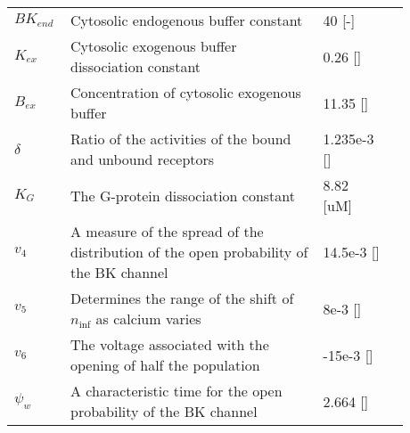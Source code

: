 \begin{table}[h!]
	\centering
	\begin{tabular}{| p{0.09\linewidth} | >{\footnotesize} p{0.6\linewidth} | >{\footnotesize} p{0.17\linewidth} | >{\footnotesize} p{0.02\linewidth} |}
		\arrayrulecolor{lightgrey}\hline
		
		$BK_{end}$      & Cytosolic endogenous buffer constant                              & 40 [-] & \cite{LoesEvert} \\
		$K_{ex}$        & Cytosolic exogenous buffer dissociation constant                  & 0.26 [\uM] & \cite{LoesEvert} \\
		$B_{ex}$        & Concentration of cytosolic exogenous buffer                       & 11.35 [\uM] & \cite{LoesEvert} \\
		$\delta$        & Ratio of the activities of the bound and unbound receptors        & 1.235e-3 [\uM] & \cite{LoesEvert}\\
		$K_G$           & The G-protein dissociation constant                               & 8.82  [uM] & \cite{LoesEvert}\\
		$v_{4}$			& A measure of the spread of the distribution of the open probability of the BK channel	& 14.5e-3 [\Volt]   &  \cite{Gonzalez1994}  
		\\
		$v_{5}$			& Determines the range of the shift of $n_\inf$ as calcium varies    		& 8e-3 [\Volt]  & \cite{LoesEvert}  \\
		$v_{6}$			& The voltage associated with the opening of half the population		& -15e-3 [\Volt]  & \cite{LoesEvert}  \\
		$ \psi_{w}$    	& A characteristic time for the open probability of the BK channel		& 2.664 [\pers] & \cite{Gonzalez1994} \\
		
		\hline
	\end{tabular}
\end{table}
